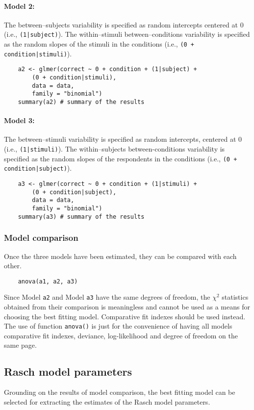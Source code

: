 \documentclass[12pt]{book}
\begin{document}
\paragraph*{Model 2:} The between--subjects variability is specified as random intercepts centered at 0 (i.e., \texttt{(1|subject)}). The within--stimuli between--conditions variability is specified as the random slopes of the stimuli in the conditions (i.e., \texttt{(0 + condition|stimuli)}).
%
\begin{lstlisting}
	a2 <- glmer(correct ~ 0 + condition + (1|subject) + 
		(0 + condition|stimuli), 
		data = data, 
		family = "binomial")
	summary(a2) # summary of the results  
\end{lstlisting}


\paragraph*{Model 3:}  
The between--stimuli variability is specified as random intercepts, centered at 0 (i.e., \texttt{(1|stimuli)}). 
The within--subjects between-conditions variability is specified as the random slopes of the respondents in the conditions (i.e., \texttt{(0 + condition|subject)}).
%
\begin{lstlisting}
	a3 <- glmer(correct ~ 0 + condition + (1|stimuli) + 
		(0 + condition|subject), 
		data = data, 
		family = "binomial")
	summary(a3) # summary of the results  
\end{lstlisting}


\subsubsection{Model comparison}

Once the three models have been estimated, they can be compared with each other. 
%
\begin{lstlisting}
	anova(a1, a2, a3)
\end{lstlisting}
Since Model \texttt{a2} and Model \texttt{a3} have the same degrees of freedom, the $\chi^2$ statistics obtained from their comparison is  meaningless and cannot be used as a means for choosing the best fitting model. Comparative fit indexes should be used instead. 
The use of function \texttt{anova()} is just for the convenience of having all models comparative fit indexes, deviance, log-likelihood and degree of freedom on the same page.

\subsection{Rasch model parameters}
Grounding on the results of model comparison, the best fitting model can be selected for extracting the estimates of the Rasch model parameters. 
\end{document}
